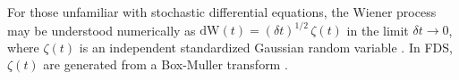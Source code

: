 For those unfamiliar with stochastic differential equations, the Wiener process may be understood numerically as $\mbox{dW}(t) = (\delta t)^{1/2} \, \zeta(t)$ in the limit $\delta t \rightarrow 0$, where $\zeta(t)$ is an independent standardized Gaussian random variable \cite{Pope:2000}.  In FDS, $\zeta(t)$ are generated from a Box-Muller transform \cite{Box-Muller:1958}.
